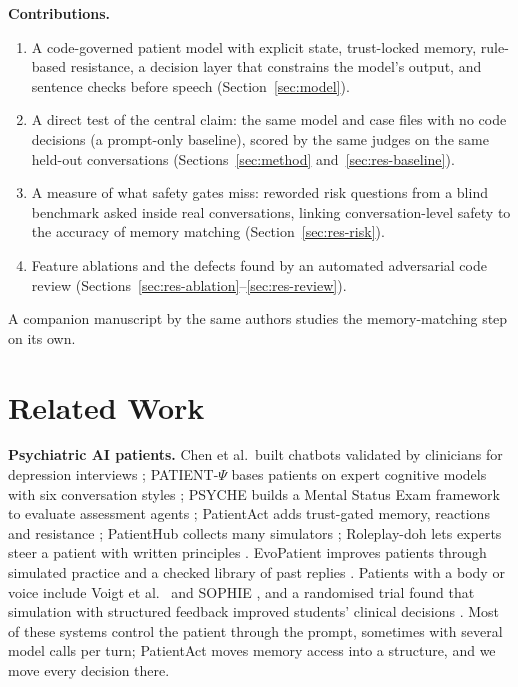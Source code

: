 \documentclass[sn-basic,Numbered]{sn-jnl}
\begin{document}
\textbf{Contributions.}
\begin{enumerate}
\item A code-governed patient model with explicit state, trust-locked memory, rule-based resistance, a decision layer that constrains the
model's output, and sentence checks before speech (Section~\ref{sec:model}).
\item A direct test of the central claim: the same model and case files with no code decisions (a prompt-only baseline), scored by the same
judges on the same held-out conversations (Sections~\ref{sec:method} and~\ref{sec:res-baseline}).
\item A measure of what safety gates miss: reworded risk questions from a blind benchmark asked inside real conversations, linking
conversation-level safety to the accuracy of memory matching (Section~\ref{sec:res-risk}).
\item Feature ablations and the defects found by an automated adversarial code review (Sections~\ref{sec:res-ablation}--\ref{sec:res-review}).
\end{enumerate}
A companion manuscript by the same authors studies the memory-matching step on its own.

\section{Related Work}\label{sec:related}
\textbf{Psychiatric AI patients.} Chen et al.\ built chatbots validated by clinicians for depression interviews \cite{chen2023llmempowered};
PATIENT-$\Psi$ bases patients on expert cognitive models with six conversation styles \cite{wang2024patient}; PSYCHE builds a Mental Status
Exam framework to evaluate assessment agents \cite{lee2025psyche}; PatientAct adds trust-gated memory, reactions and resistance
\cite{sabour2026patientact}; PatientHub collects many simulators \cite{sabour2026patienthub}; Roleplay-doh lets experts steer a patient with
written principles \cite{louie2024roleplaydoh}. EvoPatient improves patients through simulated practice and a checked library of past replies
\cite{du2024llms}. Patients with a body or voice include Voigt et al.\ \cite{voigt2025llmpowered} and SOPHIE \cite{haut2025ai}, and a randomised
trial found that simulation with structured feedback improved students' clinical decisions \cite{brugge2024llm}. Most of these systems control the
patient through the prompt, sometimes with several model calls per turn; PatientAct moves memory access into a structure, and we move every
decision there.
\end{document}
